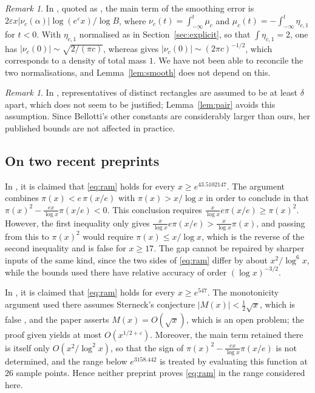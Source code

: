\documentclass[11pt]{amsart}
\numberwithin{equation}{section}
\theoremstyle{definition}
\theoremstyle{remark}
\newtheorem{remark}[theorem]{Remark}
\newcommand{\eps}{\varepsilon}
\begin{document}
\begin{remark}\label{rem:buthe}
In \cite[Proposition~4]{Buthe2016}, quoted as \cite[Proposition~1]{Buthe2018}, the main term of the smoothing error is $2\eps x|\nu_c(\alpha)|\log(e^\eps x)/\log B$, where $\nu_c(t) = \int_{-\infty}^t\mu_c$ and $\mu_c(t) = -\int_{-\infty}^t\eta_{c,1}$ for $t < 0$.
With $\eta_{c,1}$ normalised as in Section~\ref{sec:explicit}, so that $\int\eta_{c,1} = 2$, one has $|\nu_c(0)| \sim \sqrt{2/(\pi c)}$, whereas \cite[Remark~1]{Buthe2018} gives $|\nu_c(0)| \sim (2\pi c)^{-1/2}$, which corresponds to a density of total mass $1$.
We have not been able to reconcile the two normalisations, and Lemma~\ref{lem:smooth} does not depend on this.
\end{remark}

\begin{remark}
In \cite[(4.11)]{Bellotti}, representatives of distinct rectangles are assumed to be at least $\delta$ apart, which does not seem to be justified; Lemma~\ref{lem:pair} avoids this assumption.
Since Bellotti's other constants are considerably larger than ours, her published bounds are not affected in practice.
\end{remark}

\subsection{On two recent preprints}

In \cite{De2}, it is claimed that \eqref{eq:ram} holds for every $x \geq e^{43.5102147}$.
The argument combines $\pi(x) < e\,\pi(x/e)$ with $\pi(x) > x/\log x$ in order to conclude in \cite[(29)]{De2} that $\pi(x)^2 - \frac{ex}{\log x}\pi(x/e) < 0$.
This conclusion requires $\frac{x}{\log x}e\pi(x/e) \geq \pi(x)^2$.
However, the first inequality only gives $\frac{x}{\log x}e\pi(x/e) > \frac{x}{\log x}\pi(x)$, and passing from this to $\pi(x)^2$ would require $\pi(x) \leq x/\log x$, which is the reverse of the second inequality and is false for $x \geq 17$.
The gap cannot be repaired by sharper inputs of the same kind, since the two sides of \eqref{eq:ram} differ by about $x^2/\log^6x$, while the bounds used there have relative accuracy of order $(\log x)^{-3/2}$.

In \cite{De1}, it is claimed that \eqref{eq:ram} holds for every $x \geq e^{547}$.
The monotonicity argument used there assumes Sterneck's conjecture $|M(x)| < \frac12\sqrt x$, which is false \cite{Neubauer}, and the paper asserts $M(x) = O(\sqrt x)$, which is an open problem; the proof given yields at most $O(x^{1/2+\eps})$.
Moreover, the main term retained there is itself only $O(x^2/\log^2x)$, so that the sign of $\pi(x)^2 - \frac{ex}{\log x}\pi(x/e)$ is not determined, and the range below $e^{3158.442}$ is treated by evaluating this function at $26$ sample points.
Hence neither preprint proves \eqref{eq:ram} in the range considered here.
\end{document}
